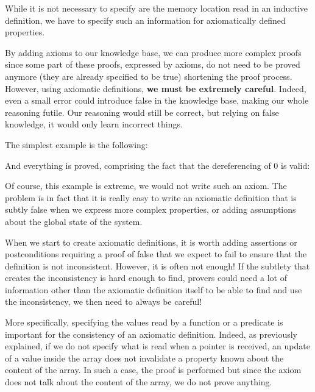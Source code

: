 While it is not necessary to specify are the memory location read in an
inductive definition, we have to specify such an information for axiomatically
defined properties.




By adding axioms to our knowledge base, we can produce more complex
proofs since some part of these proofs, expressed by axioms, do not need
to be proved anymore (they are already specified to be true) shortening
the proof process. However, using axiomatic definitions, \textbf{we must
be extremely careful}. Indeed, even a small error could introduce false
in the knowledge base, making our whole reasoning futile. Our reasoning
would still be correct, but relying on false knowledge, it would only
learn incorrect things.



The simplest example is the following:






And everything is proved, comprising the fact that the dereferencing of
0 is valid:





Of course, this example is extreme, we would not write such an axiom.
The problem is in fact that it is really easy to write an axiomatic
definition that is subtly false when we express more complex properties,
or adding assumptions about the global state of the system.







When we start to create axiomatic definitions, it is worth adding
assertions or postconditions requiring a proof of false that we expect
to fail to ensure that the definition is not inconsistent. However, it
is often not enough! If the subtlety that creates the inconsistency is
hard enough to find, provers could need a lot of information other than
the axiomatic definition itself to be able to find and use the
inconsistency, we then need to always be careful!




More specifically, specifying the values read by a function or a
predicate is important for the consistency of an axiomatic definition.
Indeed, as previously explained, if we do not specify what is read when
a pointer is received, an update of a value inside the array does not
invalidate a property known about the content of the array. In such a
case, the proof is performed but since the axiom does not talk about the
content of the array, we do not prove anything.




